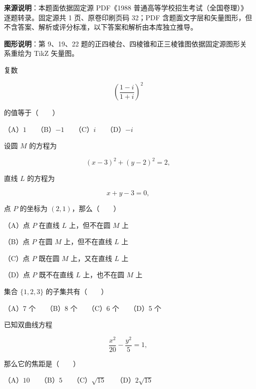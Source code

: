 


\begin{gktip}
\textbf{来源说明}：本题面依据固定源 PDF《1988 普通高等学校招生考试（全国卷理）》逐题转录。固定源共 1 页、原卷印刷页码 32；PDF 含题面文字层和矢量图形，但不含答案、解析或评分标准，以下答案和解析由本库独立推导。

\textbf{图形说明}：第 9、19、22 题的正四棱台、四棱锥和正三棱锥图依据固定源图形关系重绘为 TikZ 矢量图。
\end{gktip}

\begin{question}
复数

\nopagebreak[4]
\[
\left(\frac{1-i}{1+i}\right)^2
\]

的值等于\mbox{（　　）}

（A）$1$　　（B）$-1$　　（C）$i$　　（D）$-i$

\end{question}
\begin{question}
设圆 $M$ 的方程为

\nopagebreak[4]
\[
(x-3)^2+(y-2)^2=2,
\]

直线 $L$ 的方程为

\nopagebreak[4]
\[
x+y-3=0,
\]

点 $P$ 的坐标为 $(2,1)$，那么\mbox{（　　）}

（A）点 $P$ 在直线 $L$ 上，但不在圆 $M$ 上

（B）点 $P$ 在圆 $M$ 上，但不在直线 $L$ 上

（C）点 $P$ 既在圆 $M$ 上，又在直线 $L$ 上

（D）点 $P$ 既不在直线 $L$ 上，也不在圆 $M$ 上

\end{question}
\begin{question}
集合 $\{1,2,3\}$ 的子集共有\mbox{（　　）}

（A）7 个　　（B）8 个　　（C）6 个　　（D）5 个

\end{question}
\begin{question}
已知双曲线方程

\nopagebreak[4]
\[
\frac{x^2}{20}-\frac{y^2}{5}=1,
\]

那么它的焦距是\mbox{（　　）}

（A）$10$　　（B）$5$　　（C）$\sqrt{15}$　　（D）$2\sqrt{15}$

\end{question}
